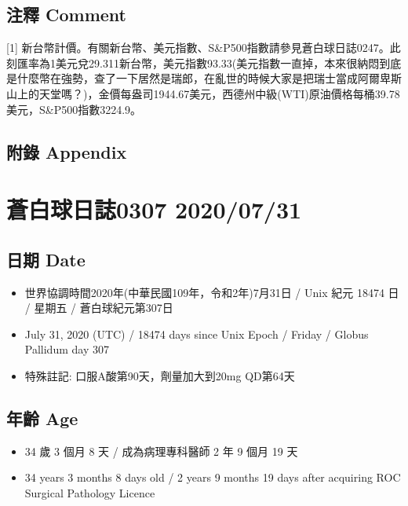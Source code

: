 \documentclass[
]{article}
\providecommand{\tightlist}{%
  \setlength{\itemsep}{0pt}\setlength{\parskip}{0pt}}
\begin{document}
\hypertarget{ux6ce8ux91cb-comment-25}{%
\subsection{注釋 Comment}\label{ux6ce8ux91cb-comment-25}}

{[}1{]}
新台幣計價。有關新台幣、美元指數、S\&P500指數請參見蒼白球日誌0247。此刻匯率為1美元兌29.311新台幣，美元指數93.33(美元指數一直掉，本來很納悶到底是什麼幣在強勢，查了一下居然是瑞郎，在亂世的時候大家是把瑞士當成阿爾卑斯山上的天堂嗎？)，金價每盎司1944.67美元，西德州中級(WTI)原油價格每桶39.78美元，S\&P500指數3224.9。

\hypertarget{ux9644ux9304-appendix-25}{%
\subsection{附錄 Appendix}\label{ux9644ux9304-appendix-25}}

\hypertarget{ux84bcux767dux7403ux65e5ux8a8c0307-20200731}{%
\section{蒼白球日誌0307
2020/07/31}\label{ux84bcux767dux7403ux65e5ux8a8c0307-20200731}}

\hypertarget{ux65e5ux671f-date-26}{%
\subsection{日期 Date}\label{ux65e5ux671f-date-26}}

\begin{itemize}
\tightlist
\item
  世界協調時間2020年(中華民國109年，令和2年)7月31日 / Unix 紀元 18474 日
  / 星期五 / 蒼白球紀元第307日
\item
  July 31, 2020 (UTC) / 18474 days since Unix Epoch / Friday / Globus
  Pallidum day 307
\item
  特殊註記: 口服A酸第90天，劑量加大到20mg QD第64天
\end{itemize}

\hypertarget{ux5e74ux9f61-age-26}{%
\subsection{年齡 Age}\label{ux5e74ux9f61-age-26}}

\begin{itemize}
\tightlist
\item
  34 歲 3 個月 8 天 / 成為病理專科醫師 2 年 9 個月 19 天
\item
  34 years 3 months 8 days old / 2 years 9 months 19 days after
  acquiring ROC Surgical Pathology Licence
\end{itemize}
\end{document}
